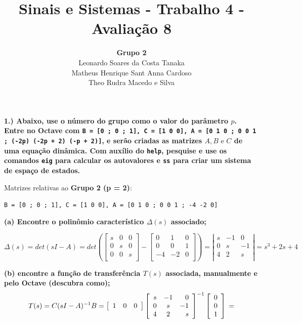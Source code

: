 \documentclass[11pt]{article}
\title{Sinais e Sistemas - Trabalho 4 - Avaliação 8}
\author{
    \textbf{Grupo 2}\\
    Leonardo Soares da Costa Tanaka\\
    Matheus Henrique Sant Anna Cardoso\\
    Theo Rudra Macedo e Silva
}
\date{}
\begin{document}
\maketitle
\thispagestyle{capa}
\newpage

\textbf{1.) Abaixo, use o número do grupo como o valor do parâmetro $p$. Entre no Octave com \texttt{B = [0 ; 0 ; 1], C = [1 0 0], A = [0 1 0 ; 0 0 1 ; (-2p) (-2p + 2) (-p + 2)]}, e serão criadas as matrizes $A, B \text{ e } C$ de uma equação dinâmica. Com auxílio do \texttt{help}, pesquise e use os comandos \texttt{eig} para calcular os autovalores e \texttt{ss} para criar um sistema de espaço de estados.}

Matrizes relativas ao \textbf{Grupo 2 (p = 2)}:

\texttt{B = [0 ; 0 ; 1], C = [1 0 0], A = [0 1 0 ; 0 0 1 ; -4 -2 0]}

\textbf{(a) Encontre o polinômio característico $\Delta(s)$ associado;}

\[
\Delta(s) = det(sI - A) = det\left(
\left[ {\begin{array}{ccc}
  s & 0 & 0 \\
  0 & s & 0 \\
  0 & 0 & s \\
\end{array} } \right]
-
\left[ {\begin{array}{ccc}
    0 & 1 & 0 \\
    0 & 0 & 1 \\
    -4 & -2 & 0 \\
  \end{array} } \right]
  \right)
  =
  \left| \begin{array}{rcr}
    s & -1  & 0 \\ 
    0 & s & -1 \\
    4 & 2  & s \\
  \end{array}
  \right|
  = s^3 + 2s + 4
\]

\textbf{(b) encontre a função de transferência $T(s)$ associada, manualmente e pelo Octave (descubra como);}
\[
  T(s) = C(sI - A)^{-1}B =
  \left[ {\begin{array}{ccc}
    1 & 0 & 0 \\
  \end{array} } \right]
  \left[ \begin{array}{rcr}
    s & -1  & 0 \\ 
    0 & s & -1 \\
    4 & 2  & s \\
  \end{array} \right]^{-1}
  \left[ {\begin{array}{c}
    0 \\
    0 \\
    1 \\
  \end{array} } \right]
  \\
=
\] 
 
\end{document}
